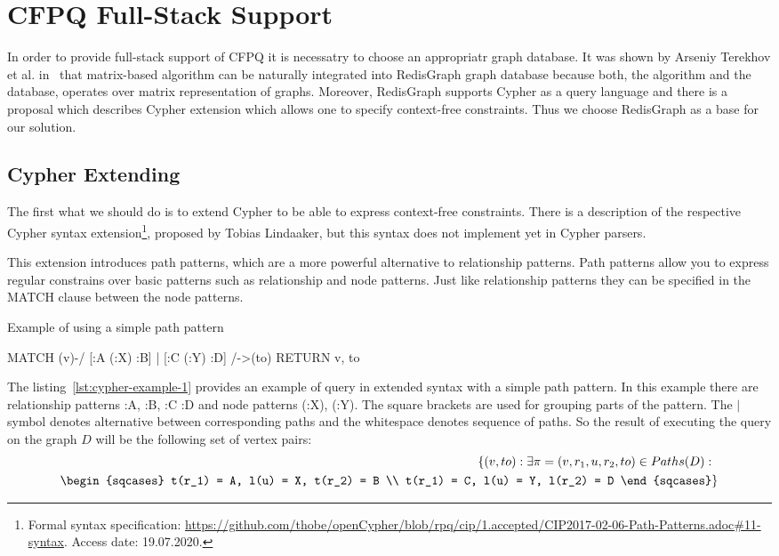 \section{CFPQ Full-Stack Support}

In order to provide full-stack support of CFPQ it is necessatry to choose an appropriatr graph database.
It was shown by Arseniy Terekhov et al. in~\cite{10.1145/3398682.3399163} that matrix-based algorithm can be naturally integrated into RedisGraph graph database because both, the algorithm and the database, operates over matrix representation of graphs.
Moreover, RedisGraph supports Cypher as a query language and there is a proposal which describes Cypher extension which allows one to specify context-free constraints.
Thus we choose RedisGraph as a base for our solution.  


\subsection{Cypher Extending}
\label{subsec:cypher-extension}

The first what we should do is to extend Cypher to be able to express context-free constraints.
There is a description of the respective Cypher syntax extension\footnote{\label{cypher-proposal}Formal syntax specification: \url{https://github.com/thobe/openCypher/blob/rpq/cip/1.accepted/CIP2017-02-06-Path-Patterns.adoc\#11-syntax}. Access date: 19.07.2020.}, proposed by Tobias Lindaaker, but this syntax does not implement yet in Cypher parsers.

This extension introduces path patterns, which are a more powerful alternative to relationship patterns. Path patterns allow you to express regular constrains over basic patterns such as relationship and node patterns. Just like relationship patterns they can be specified in the MATCH clause between the node patterns.

\begin{algorithm}
\begin{algorithmic}[1]
\caption{Example of using a simple path pattern}
\label{lst:cypher-example-1}
\State MATCH (v)-/ [:A (:X) :B] | [:C (:Y) :D] /->(to)
\State RETURN v, to
\end{algorithmic}
\end{algorithm}

The listing~\ref{lst:cypher-example-1} provides an example of query in extended syntax with a simple path pattern. In this example there are relationship patterns :A, :B, :C :D and node patterns (:X), (:Y). The square brackets are used for grouping parts of the pattern. The $|$ symbol denotes alternative between corresponding paths and the whitespace denotes sequence of paths. So the result of executing the query on the graph $D$ will be the following set of vertex pairs:
\begin{align*}
\{(v, to): \exists \pi = (v,r_1,u,r_2,to) \in Paths(D):& \\
\begin{sqcases}
    t(r_1) = A, l(u) = X, t(r_2) = B  \\
    t(r_1) = C, l(u) = Y, l(r_2) = D
\end{sqcases}&\}
\end{align*}

